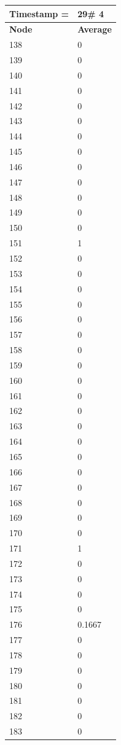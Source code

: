 \begin{tabular}{|l||l|}
\hline
\textbf{Timestamp =} & \textbf{29}\# 4\\\hline
	\textbf{Node} & \textbf{Average} \\ \hline
\hline
	138 & 0 \\ \hline
	139 & 0 \\ \hline
	140 & 0 \\ \hline
	141 & 0 \\ \hline
	142 & 0 \\ \hline
	143 & 0 \\ \hline
	144 & 0 \\ \hline
	145 & 0 \\ \hline
	146 & 0 \\ \hline
	147 & 0 \\ \hline
	148 & 0 \\ \hline
	149 & 0 \\ \hline
	150 & 0 \\ \hline
	151 & 1 \\ \hline
	152 & 0 \\ \hline
	153 & 0 \\ \hline
	154 & 0 \\ \hline
	155 & 0 \\ \hline
	156 & 0 \\ \hline
	157 & 0 \\ \hline
	158 & 0 \\ \hline
	159 & 0 \\ \hline
	160 & 0 \\ \hline
	161 & 0 \\ \hline
	162 & 0 \\ \hline
	163 & 0 \\ \hline
	164 & 0 \\ \hline
	165 & 0 \\ \hline
	166 & 0 \\ \hline
	167 & 0 \\ \hline
	168 & 0 \\ \hline
	169 & 0 \\ \hline
	170 & 0 \\ \hline
	171 & 1 \\ \hline
	172 & 0 \\ \hline
	173 & 0 \\ \hline
	174 & 0 \\ \hline
	175 & 0 \\ \hline
	176 & 0.1667 \\ \hline
	177 & 0 \\ \hline
	178 & 0 \\ \hline
	179 & 0 \\ \hline
	180 & 0 \\ \hline
	181 & 0 \\ \hline
	182 & 0 \\ \hline
	183 & 0 \\ \hline
\end{tabular}
